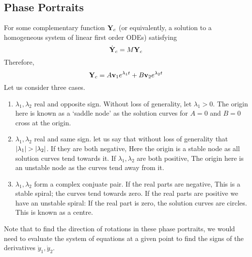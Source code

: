 \subsection{Phase Portraits}
For some complementary function \(\vb Y_c\) (or equivalently, a solution to a homogeneous system of linear first order ODEs) satisfying
\begin{equation}\label{phasematrix}
	\dot {\vb Y}_c = M\vb Y_c
\end{equation}
Therefore,
\[
	\vb Y_c = A\vb v_1 e^{\lambda_1 t} + B\vb v_2 e^{\lambda_2 t}
\]
Let us consider three cases.
\begin{enumerate}
	\item \(\lambda_1, \lambda_2\) real and opposite sign.
	      Without loss of generality, let \(\lambda_1 > 0\).
	      The origin here is known as a `saddle node' as the solution curves for \(A=0\) and \(B=0\) cross at the origin.
	\item \(\lambda_1, \lambda_2\) real and same sign.
	      let us say that without loss of generality that \(\abs{\lambda_1} > \abs{\lambda_2}\).
	      If they are both negative, %
	      Here the origin is a stable node as all solution curves tend towards it.
	      If \(\lambda_1, \lambda_2\) are both positive, %
	      The origin here is an unstable node as the curves tend away from it.
	\item \(\lambda_1, \lambda_2\) form a complex conjuate pair.
	      If the real parts are negative, %
	      This is a stable spiral; the curves tend towards zero.
	      If the real parts are positive we have an unstable spiral:
	      If the real part is zero, the solution curves are circles.
	      This is known as a centre.
\end{enumerate}
Note that to find the direction of rotations in these phase portraits, we would need to evaluate the system of equations at a given point to find the signs of the derivatives \(\dot y_1, \dot y_2\).

